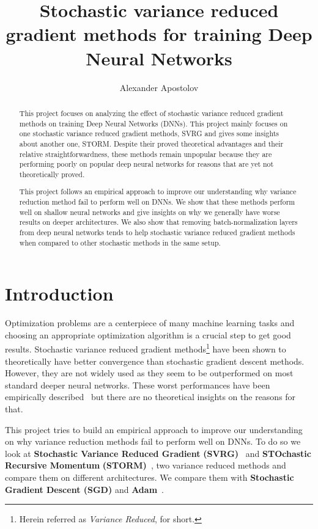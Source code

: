 \documentclass[a4paper,11pt,oneside]{report}
\title{Stochastic variance reduced gradient methods for training Deep Neural Networks}
\author{Alexander Apostolov}
\begin{document}
\maketitle

\begin{abstract}

This project focuses on analyzing the effect of stochastic variance reduced gradient methods on training Deep Neural Networks (DNNs). This project mainly focuses on one stochastic variance reduced gradient methods, SVRG and gives some insights about another one, STORM. Despite their proved theoretical advantages and their relative straightforwardness, these methods remain unpopular because they are performing poorly on popular deep neural networks for reasons that are yet not theoretically proved.  

This project follows an empirical approach to improve our understanding  why variance reduction method fail to  perform well on DNNs. We show that these methods perform well on shallow neural networks and give insights on why we generally have worse results on deeper architectures. We also show that removing batch-normalization layers from deep neural networks tends to help stochastic variance reduced gradient methods when compared to other stochastic methods in the same setup.

\end{abstract}

\maketoc

\chapter{Introduction}

Optimization problems are a centerpiece of many machine learning tasks and choosing an appropriate optimization algorithm is a crucial step to get good results. Stochastic variance reduced gradient methods\footnote{Herein referred as \textit{Variance Reduced},  for short.} have been shown to theoretically have better convergence than stochastic gradient descent methods. However, they are not widely used as they seem to be outperformed on most standard deeper neural networks.  
These worst performances have been empirically described~\cite{Defazio2019} but there are no theoretical insights on the reasons for that.  

This project tries to build an empirical approach to improve our understanding on why variance reduction methods fail to perform well on DNNs. To do so we look at \textbf{Stochastic Variance Reduced Gradient} \textbf{(SVRG)}~\cite{NIPS2013_ac1dd209} and \textbf{STOchastic Recursive Momentum} \textbf{(STORM)}~\cite{Cutkosky2019storm}, two variance reduced methods and compare them on different architectures. We compare them with \textbf{Stochastic Gradient Descent (SGD)} and \textbf{Adam}~\cite{kingma2014adam}.  
\end{document}
